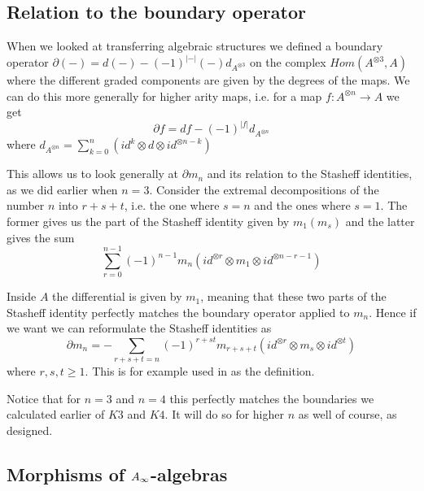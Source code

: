 
\subsection{Relation to the boundary operator}

When we looked at transferring algebraic structures we defined a boundary operator $\partial (-) = d(-)-(-1)^{|-|}(-)d_{A^{\otimes 3}}$ on the complex $Hom(A^{\otimes 3}, A)$ where the different graded components are given by the degrees of the maps. We can do this more generally for higher arity maps, i.e. for a map $f\colon A^{\otimes n}\longrightarrow A$ we get
\begin{equation*}
    \partial f = df -(-1)^{|f|}d_{A^{\otimes n}}
\end{equation*}
where $d_{A^{\otimes n}}= \sum_{k=0}^{n}(id^{k}\otimes d\otimes id^{\otimes n-k})$

This allows us to look generally at $\partial m_n$ and its relation to the Stasheff identities, as we did earlier when $n=3$. Consider the extremal decompositions of the number $n$ into $r+s+t$, i.e. the one where $s=n$ and the ones where $s=1$. The former gives us the part of the Stasheff identity given by $m_1(m_s)$ and the latter gives the sum 
\begin{equation*}
    \sum_{r=0}^{n-1} (-1)^{n-1}m_n(id^{\otimes r}\otimes m_1\otimes id^{\otimes n-r-1})
\end{equation*}

Inside $A$ the differential is given by $m_1$, meaning that these two parts of the Stasheff identity perfectly matches the boundary operator applied to $m_n$. Hence if we want we can reformulate the Stasheff identities as
\begin{equation*}
    \partial m_n = - \sum_{r+s+t=n}(-1)^{r+st}m_{r+s+t}(id^{\otimes r}\otimes m_s\otimes id^{\otimes t})
\end{equation*}
where $r,s,t\geq 1$. This is for example used in \cite{AHO} as the definition. 

Notice that for $n=3$ and $n=4$ this perfectly matches the boundaries we calculated earlier of $K3$ and $K4$. It will do so for higher $n$ as well of course, as designed. 


\subsection{Morphisms of \texorpdfstring{$A_{\infty}$}{A}-algebras}

